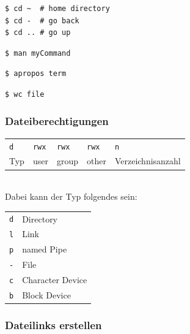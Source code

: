 	\lstShell
	\begin{lstlisting}
$ cd ~  # home directory
$ cd -  # go back
$ cd .. # go up
	\end{lstlisting}


	\begin{lstlisting}
$ man myCommand
	\end{lstlisting}

	\begin{lstlisting}
$ apropos term
	\end{lstlisting}

	\begin{lstlisting}
$ wc file
	\end{lstlisting}

	\subsubsection*{Dateiberechtigungen} %
	\label{ssub:dateiberechtigungen}
	
	\begin{tabular}{lllll}
		\texttt{d} 	& \texttt{rwx} 	& \texttt{rwx} 	& \texttt{rwx} 	& \texttt{n}\\
		Typ			& user 			& group 		& other 		& Verzeichnisanzahl
	\end{tabular}\\

	Dabei kann der Typ folgendes sein:

	\begin{tabular}{ll}
		\texttt{d} 	& Directory\\
		\texttt{l} 	& Link\\
		\texttt{p} 	& named Pipe\\
		\texttt{-} 	& File\\
		\texttt{c} 	& Character Device\\
		\texttt{b} 	& Block Device
	\end{tabular}


	\subsubsection*{Dateilinks erstellen} %
	\label{ssub:dateilinks_erstellen}
	
